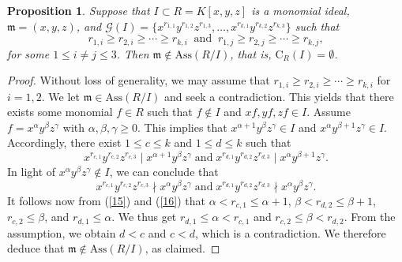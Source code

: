 \documentclass[11pt]{amsart}
\newtheorem{proposition}[theorem]{Proposition}
\begin{document}
\begin{proposition} \label{Pro.Not.maximal.1}
   Suppose that   $I \subset R=K[x,y,z]$ is  a monomial ideal, $\mathfrak{m}=(x,y,z)$, and 
$\mathcal{G}(I)=\{x^{r_{1,1}} y^{r_{1,2}} z^{r_{1,3}},  \ldots, x^{r_{k,1}} y^{r_{k,2}} z^{r_{k,3}}\}$ such that   
  $$r_{1,i} \geq r_{2,i} \geq \cdots \geq r_{k, i}\; \; \text{and} \; \; r_{1,j} \geq r_{2,j} \geq \cdots \geq r_{k, j},$$ 
    for some $1\leq i\neq j \leq 3$. 
     Then    $\mathfrak{m}\notin \mathrm{Ass}(R/I)$, that is, $\mathrm{C}_R(I)=\emptyset$. 
\end{proposition}

\begin{proof} 
Without loss of generality, we may assume that  $r_{1,i} \geq r_{2,i} \geq \cdots \geq r_{k, i}$ for $i=1,2$. We let 
  $\mathfrak{m}\in \mathrm{Ass}(R/I)$ and seek a contradiction. This yields that  there exists some monomial $f\in R$ such that  $f\notin I$ and 
  $xf,yf,zf\in I$.  Assume $f=x^{\alpha}y^{\beta}z^{\gamma}$  with $\alpha, \beta , \gamma\geq 0$.
   This implies that  $x^{\alpha+1}y^{\beta}z^{\gamma}\in I$ and   $x^{\alpha}y^{\beta+1}z^{\gamma}\in I$. 
Accordingly,  there exist  $1\leq c \leq k$  and $1\leq d \leq k$  such that 
  \begin{equation} \label{15}
  x^{r_{c,1}} y^{r_{c,2}} z^{r_{c,3}} \mid x^{\alpha+1}y^{\beta}z^{\gamma} \;  \text {and} \;  
  x^{r_{d,1}} y^{r_{d,2}} z^{r_{d,3}} \mid  x^{\alpha} y^{\beta+1}z^{\gamma}.  
    \end{equation}
       In light   of    $x^{\alpha}y^{\beta}z^{\gamma} \notin I$,   we can conclude that 
      \begin{equation} \label{16}
       x^{r_{c,1}} y^{r_{c,2}} z^{r_{c,3}} \nmid x^{\alpha}y^{\beta}z^{\gamma} \;  \text {and} \;  
  x^{r_{d,1}} y^{r_{d,2}} z^{r_{d,3}} \nmid  x^{\alpha} y^{\beta}z^{\gamma}.
      \end{equation}
     It follows now from (\ref{15}) and (\ref{16})  that  $\alpha < r_{c,1} \leq \alpha+1$, $\beta < r_{d,2} \leq \beta+1$, 
   $r_{c, 2} \leq \beta$, and $r_{d, 1} \leq \alpha$. We thus get  $r_{d, 1} \leq \alpha < r_{c,1}$ and 
   $r_{c, 2} \leq \beta < r_{d,2}$. From  the assumption, we obtain $d<c$ and  $c<d$, which is  a contradiction. We therefore deduce  that   $\mathfrak{m}\notin \mathrm{Ass}(R/I)$, as claimed.  
\end{proof}


\end{document}
